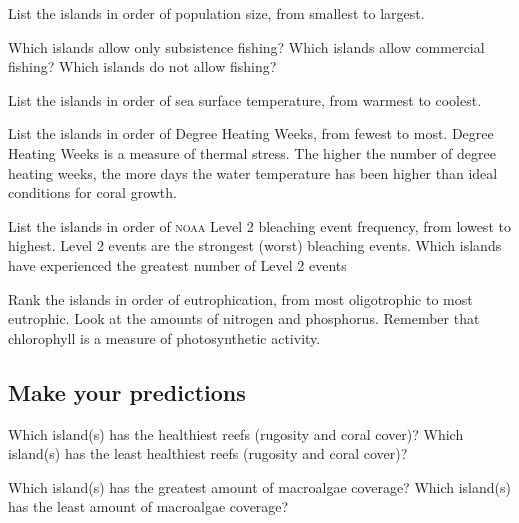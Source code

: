 \documentclass[12pt, hidelinks]{exam}
\begin{document}
\begin{questions}

\question
List the islands in order of population size, from smallest to largest.


\question
Which islands allow only subsistence fishing? Which islands allow commercial fishing? Which islands do not allow fishing?


\question
List the islands in order of sea surface temperature, from warmest to coolest.


\question
List the islands in order of Degree Heating Weeks, from fewest to most. Degree Heating Weeks is a measure of thermal stress. The higher the number of degree heating weeks, the more days the water temperature has been higher than ideal conditions for coral growth.


\question
List the islands in order of \textsc{noaa} Level 2 bleaching event frequency, from lowest to highest. Level 2 events are the strongest (worst) bleaching events. Which islands have experienced the greatest number of Level 2 events


\newpage

\question
Rank the islands in order of eutrophication, from most oligotrophic to most eutrophic. Look at the amounts of nitrogen and phosphorus. Remember that chlorophyll is a measure of photosynthetic activity.


\subsection*{Make your predictions}

\question
Which island(s) has the healthiest reefs (rugosity and coral cover)? Which island(s) has the least healthiest reefs (rugosity and coral cover)?


\question
Which island(s) has the greatest amount of macroalgae coverage? Which island(s) has the least amount of macroalgae coverage?


\end{questions}
\end{document}
